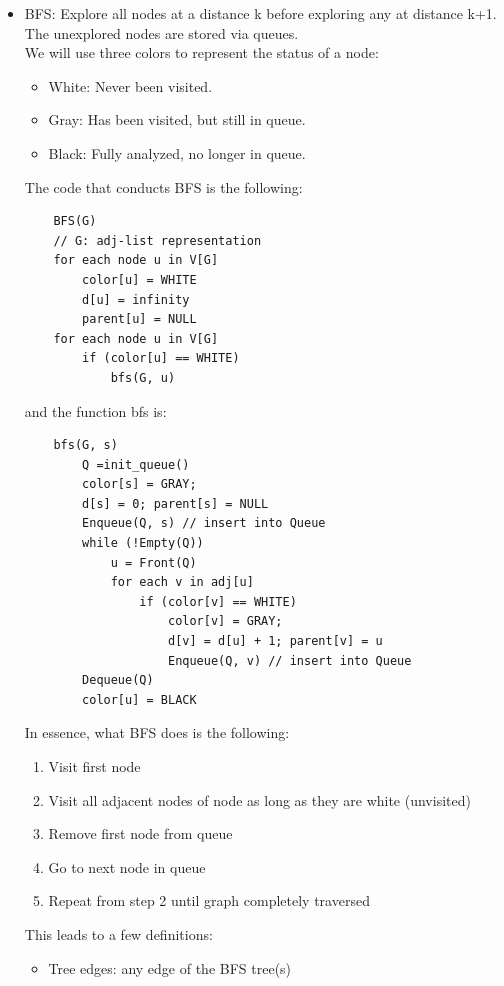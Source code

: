 \documentclass[nobib]{tufte-handout}
\begin{document}
\begin{itemize}
    \item BFS: Explore all nodes at a distance k before exploring any at distance k+1.\\
    The unexplored nodes are stored via queues.\\
    We will use three colors to represent the status of a node:\\
    \begin{itemize}
        \item White: Never been visited.
        \item Gray: Has been visited, but still in queue.
        \item Black: Fully analyzed, no longer in queue.
    \end{itemize}
    The code that conducts BFS is the following:
    \begin{lstlisting}
    BFS(G)
    // G: adj-list representation
    for each node u in V[G]
        color[u] = WHITE
        d[u] = infinity
        parent[u] = NULL
    for each node u in V[G]
        if (color[u] == WHITE)
            bfs(G, u)
    \end{lstlisting}
    and the function bfs is:
    \begin{lstlisting}
    bfs(G, s)
        Q =init_queue()
        color[s] = GRAY;
        d[s] = 0; parent[s] = NULL
        Enqueue(Q, s) // insert into Queue
        while (!Empty(Q))
            u = Front(Q)
            for each v in adj[u]
                if (color[v] == WHITE)
                    color[v] = GRAY;
                    d[v] = d[u] + 1; parent[v] = u
                    Enqueue(Q, v) // insert into Queue
        Dequeue(Q)
        color[u] = BLACK
    \end{lstlisting}
    In essence, what BFS does is the following:
    \begin{enumerate}
        \item Visit first node
        \item Visit all adjacent nodes of node as long as they are white (unvisited)
        \item Remove first node from queue
        \item Go to next node in queue
        \item Repeat from step 2 until graph completely traversed
    \end{enumerate}
    This leads to a few definitions:
    \begin{itemize}
        \item Tree edges: any edge of the BFS tree(s)

\end{itemize}
\end{itemize}
\end{document}
